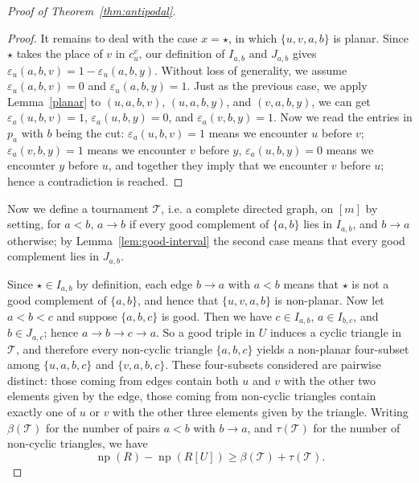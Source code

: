 \documentclass{article}
\theoremstyle{plain}
\theoremstyle{definition}
\theoremstyle{remark}
\newcommand{\np}{\operatorname{np}}
\begin{document}
\begin{proof}[Proof of Theorem~\ref{thm:antipodal}]
\begin{proof}
It remains to deal with the case \(x=\star\), in which
\(\{u,v,a,b\}\) is planar.  Since \(\star\) takes the place of \(v\) in
\(c_u^v\), our definition of \(I_{a,b}\) and \(J_{a,b}\) gives
\(\varepsilon_u(a,b,v)=1-\varepsilon_u(a,b,y)\). Without loss of generality, we assume \(\varepsilon_u(a,b,v)=0\) and \(\varepsilon_u(a,b,y)=1\). Just as the previous case, we apply Lemma~\ref{planar} to \((u,a,b,v)\), \((u,a,b,y)\), and \((v,a,b,y)\), we can get \(\varepsilon_a(u,b,v)=1\), \(\varepsilon_a(u,b,y)=0\), and \(\varepsilon_a(v,b,y)=1\). Now we read the entries in \(p_a\) with \(b\) being the cut: \(\varepsilon_a(u,b,v)=1\) means we encounter \(u\) before \(v\);
\(\varepsilon_a(v,b,y)=1\) means we encounter \(v\) before \(y\), \(\varepsilon_a(u,b,y)=0\) means we encounter \(y\) before \(u\), and together they imply that we encounter \(v\) before \(u\); hence a contradiction is reached.
\end{proof}

Now we define a tournament \(\mathcal T\), i.e. a complete directed graph, on \([m]\) by setting, for
\(a<b\), \(a\to b\) if every good complement of \(\{a,b\}\) lies in
\(I_{a,b}\), and \(b\to a\) otherwise; by
Lemma~\ref{lem:good-interval} the second case means that every good
complement lies in \(J_{a,b}\).

Since \(\star \in I_{a,b}\) by definition, each edge
\(b\to a\) with \(a<b\) means that \(\star\) is not a good complement
of \(\{a,b\}\), and hence that \(\{u,v,a,b\}\) is non-planar. Now let \(a<b<c\) and suppose \(\{a,b,c\}\) is good.  Then we have
\(c\in I_{a,b}\), \(a\in I_{b,c}\), and \(b\in J_{a,c}\);
hence \(a\to b\to c\to a\).  So a good triple in \(U\) induces a
cyclic triangle in \(\mathcal{T}\), and therefore every non-cyclic triangle
\(\{a,b,c\}\) yields a non-planar four-subset among
\(\{u,a,b,c\}\) and \(\{v,a,b,c\}\). These four-subsets considered are pairwise
distinct: those coming from edges contain both \(u\) and \(v\) with the other two elements given by the edge, those
coming from non-cyclic triangles contain exactly one of \(u\) or \(v\) with the other three elements given by the triangle. Writing \(\beta(\mathcal T)\) for the number
of pairs \(a<b\) with \(b\to a\), and \(\tau(\mathcal T)\) for the
number of non-cyclic triangles, we have
\begin{equation}\label{eq:new-np-tournament}
\np(R)-\np(R[U])\geq \beta(\mathcal T)+\tau(\mathcal T).
\end{equation}


\end{proof}
\end{document}
